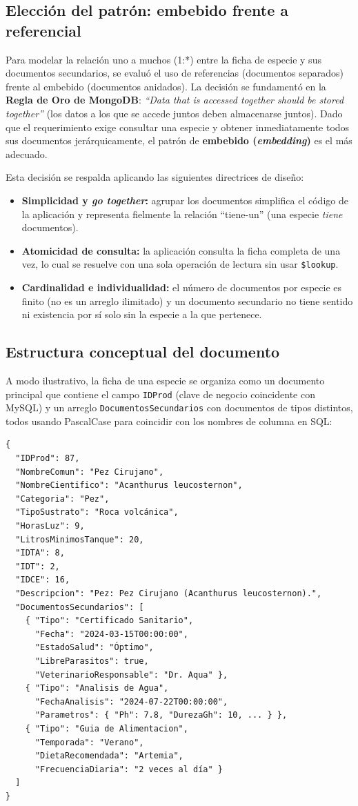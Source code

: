 \documentclass[11pt, a4paper]{article}
\begin{document}
\subsection{Elección del patrón: embebido frente a referencial}
Para modelar la relación uno a muchos (1:*) entre la ficha de especie y sus documentos secundarios, se evaluó el uso de referencias (documentos separados) frente al embebido (documentos anidados). La decisión se fundamentó en la \textbf{Regla de Oro de MongoDB}: \textit{``Data that is accessed together should be stored together''} (los datos a los que se accede juntos deben almacenarse juntos). Dado que el requerimiento exige consultar una especie y obtener inmediatamente todos sus documentos jerárquicamente, el patrón de \textbf{embebido (\textit{embedding})} es el más adecuado.

Esta decisión se respalda aplicando las siguientes directrices de diseño:
\begin{itemize}[leftmargin=1.5em]
    \item \textbf{Simplicidad y \textit{go together}:} agrupar los documentos simplifica el código de la aplicación y representa fielmente la relación ``tiene-un'' (una especie \textit{tiene} documentos).
    \item \textbf{Atomicidad de consulta:} la aplicación consulta la ficha completa de una vez, lo cual se resuelve con una sola operación de lectura sin usar \texttt{\$lookup}.
    \item \textbf{Cardinalidad e individualidad:} el número de documentos por especie es finito (no es un arreglo ilimitado) y un documento secundario no tiene sentido ni existencia por sí solo sin la especie a la que pertenece.
\end{itemize}

\subsection{Estructura conceptual del documento}
A modo ilustrativo, la ficha de una especie se organiza como un documento principal que contiene el campo \texttt{IDProd} (clave de negocio coincidente con MySQL) y un arreglo \texttt{DocumentosSecundarios} con documentos de tipos distintos, todos usando PascalCase para coincidir con los nombres de columna en SQL:

\begin{lstlisting}
{
  "IDProd": 87,
  "NombreComun": "Pez Cirujano",
  "NombreCientifico": "Acanthurus leucosternon",
  "Categoria": "Pez",
  "TipoSustrato": "Roca volcánica",
  "HorasLuz": 9,
  "LitrosMinimosTanque": 20,
  "IDTA": 8,
  "IDT": 2,
  "IDCE": 16,
  "Descripcion": "Pez: Pez Cirujano (Acanthurus leucosternon).",
  "DocumentosSecundarios": [
    { "Tipo": "Certificado Sanitario",
      "Fecha": "2024-03-15T00:00:00",
      "EstadoSalud": "Óptimo",
      "LibreParasitos": true,
      "VeterinarioResponsable": "Dr. Aqua" },
    { "Tipo": "Analisis de Agua",
      "FechaAnalisis": "2024-07-22T00:00:00",
      "Parametros": { "Ph": 7.8, "DurezaGh": 10, ... } },
    { "Tipo": "Guia de Alimentacion",
      "Temporada": "Verano",
      "DietaRecomendada": "Artemia",
      "FrecuenciaDiaria": "2 veces al día" }
  ]
}
\end{lstlisting}
\end{document}

